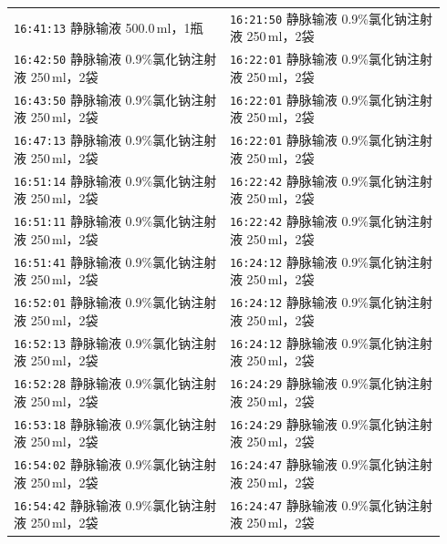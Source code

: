 \documentclass[UTF8,10pt,a4paper,fontset=fandol]{ctexart}
\begin{document}
\newpage


\begin{small}
\begin{tabular}{p{0.47\linewidth}p{0.47\linewidth}}
\texttt{16:41:13} \quad 静脉输液 500.0\,ml，1瓶
&
\texttt{16:21:50} \quad 静脉输液 0.9\%氯化钠注射液 250\,ml，2袋
\\
\texttt{16:42:50} \quad 静脉输液 0.9\%氯化钠注射液 250\,ml，2袋
&
\texttt{16:22:01} \quad 静脉输液 0.9\%氯化钠注射液 250\,ml，2袋
\\
\texttt{16:43:50} \quad 静脉输液 0.9\%氯化钠注射液 250\,ml，2袋
&
\texttt{16:22:01} \quad 静脉输液 0.9\%氯化钠注射液 250\,ml，2袋
\\
\texttt{16:47:13} \quad 静脉输液 0.9\%氯化钠注射液 250\,ml，2袋
&
\texttt{16:22:01} \quad 静脉输液 0.9\%氯化钠注射液 250\,ml，2袋
\\
\texttt{16:51:14} \quad 静脉输液 0.9\%氯化钠注射液 250\,ml，2袋
&
\texttt{16:22:42} \quad 静脉输液 0.9\%氯化钠注射液 250\,ml，2袋
\\
\texttt{16:51:11} \quad 静脉输液 0.9\%氯化钠注射液 250\,ml，2袋
&
\texttt{16:22:42} \quad 静脉输液 0.9\%氯化钠注射液 250\,ml，2袋
\\
\texttt{16:51:41} \quad 静脉输液 0.9\%氯化钠注射液 250\,ml，2袋
&
\texttt{16:24:12} \quad 静脉输液 0.9\%氯化钠注射液 250\,ml，2袋
\\
\texttt{16:52:01} \quad 静脉输液 0.9\%氯化钠注射液 250\,ml，2袋
&
\texttt{16:24:12} \quad 静脉输液 0.9\%氯化钠注射液 250\,ml，2袋
\\
\texttt{16:52:13} \quad 静脉输液 0.9\%氯化钠注射液 250\,ml，2袋
&
\texttt{16:24:12} \quad 静脉输液 0.9\%氯化钠注射液 250\,ml，2袋
\\
\texttt{16:52:28} \quad 静脉输液 0.9\%氯化钠注射液 250\,ml，2袋
&
\texttt{16:24:29} \quad 静脉输液 0.9\%氯化钠注射液 250\,ml，2袋
\\
\texttt{16:53:18} \quad 静脉输液 0.9\%氯化钠注射液 250\,ml，2袋
&
\texttt{16:24:29} \quad 静脉输液 0.9\%氯化钠注射液 250\,ml，2袋
\\
\texttt{16:54:02} \quad 静脉输液 0.9\%氯化钠注射液 250\,ml，2袋
&
\texttt{16:24:47} \quad 静脉输液 0.9\%氯化钠注射液 250\,ml，2袋
\\
\texttt{16:54:42} \quad 静脉输液 0.9\%氯化钠注射液 250\,ml，2袋
&
\texttt{16:24:47} \quad 静脉输液 0.9\%氯化钠注射液 250\,ml，2袋

\end{tabular}
\end{small}
\end{document}
